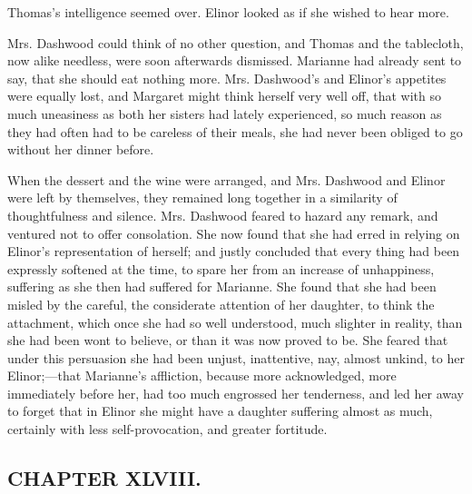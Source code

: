 Thomas's intelligence seemed over. Elinor looked as if she wished to hear more.





Mrs. Dashwood could think of no other question, and Thomas and the tablecloth, now alike needless, were soon afterwards dismissed. Marianne had already sent to say, that she should eat nothing more. Mrs. Dashwood's and Elinor's appetites were equally lost, and Margaret might think herself very well off, that with so much uneasiness as both her sisters had lately experienced, so much reason as they had often had to be careless of their meals, she had never been obliged to go without her dinner before.

When the dessert and the wine were arranged, and Mrs. Dashwood and Elinor were left by themselves, they remained long together in a similarity of thoughtfulness and silence. Mrs. Dashwood feared to hazard any remark, and ventured not to offer consolation. She now found that she had erred in relying on Elinor's representation of herself; and justly concluded that every thing had been expressly softened at the time, to spare her from an increase of unhappiness, suffering as she then had suffered for Marianne. She found that she had been misled by the careful, the considerate attention of her daughter, to think the attachment, which once she had so well understood, much slighter in reality, than she had been wont to believe, or than it was now proved to be. She feared that under this persuasion she had been unjust, inattentive, nay, almost unkind, to her Elinor;---that Marianne's affliction, because more acknowledged, more immediately before her, had too much engrossed her tenderness, and led her away to forget that in Elinor she might have a daughter suffering almost as much, certainly with less self-provocation, and greater fortitude.

\subsection[chapter-xlviii.]{\useURL[url48][][][]\from[url48]CHAPTER XLVIII.}

